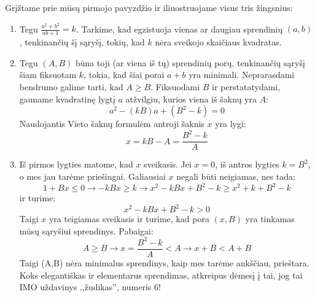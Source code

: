 Grįžtame prie mūsų pirmojo pavyzdžio ir iliuostruojame visus tris žingsnius:
\begin{sprendimas}
\begin{enumerate}
\item Tegu $\frac{a^2+b^2}{ab+1}=k$. Tarkime, kad egzistuoja vienas ar daugiau sprendinių $(a,b)$, tenkinančių šį sąryšį, tokių, kad $k$ nėra sveikojo skaičiaus kvadratas.
\item Tegu $(A,B)$ būna toji (ar viena iš tų) sprendinių porų, tenkinančių sąryšį šiam fiksuotam $k$, tokia, kad šiai porai $a+b$ yra minimali. Neprarasdami bendrumo galime tarti, kad $A\geq B$. Fiksuodami $B$ ir perstatatydami, gauname kvadratinę lygtį $a$ atžvilgiu, kurios viena iš šaknų yra $A$: $$a^2-(kB)a+(B^2-k)=0$$ Naudojantis Vieto šaknų formulėm antroji šaknis $x$ yra lygi: $$x=kB-A=\frac{B^2-k}{A}$$
\item Iš pirmos lygties matome, kad $x$ sveikasis. Jei $x=0$, iš antros lygties $k=B^2$, o mes jau tarėme priešingai. Galiausiai $x$ negali būti neigiamas, nes tada: $$1+Bx\leq 0 \rightarrow -kBx\geq k \rightarrow x^2-kBx+B^2-k\geq x^2+k+B^2-k$$ ir turime:$$x^2-kBx+B^2-k>0$$ Taigi $x$ yra teigiamas sveikasis ir turime, kad pora $(x,B)$ yra tinkamas mūsų sąryšiui sprendinys. Pabaigai:$$A\geq B \rightarrow x=\frac{B^2-k}{A}<A \rightarrow x+B<A+B$$ Taigi (A,B) nėra minimalus sprendinys, kaip mes tarėme ankščiau, prieštara. Koks elegantiškas ir elementarus sprendimas, atkreipus dėmesį į tai, jog tai IMO uždavinys ,,žudikas'', numeris 6!
\end{enumerate}
\end{sprendimas}
